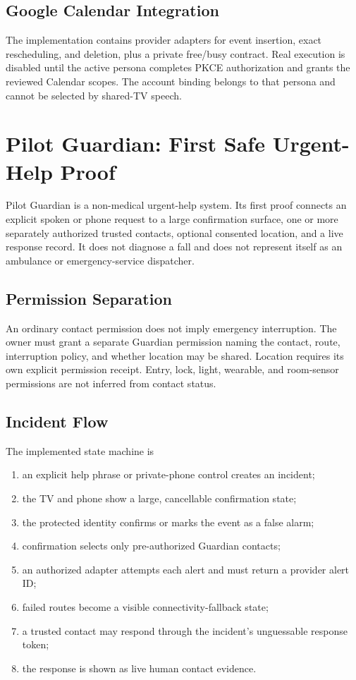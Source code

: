 \subsection{Google Calendar Integration}

The implementation contains provider adapters for event insertion, exact
rescheduling, and deletion, plus a private free/busy contract.  Real execution is
disabled until the active persona completes PKCE authorization and grants the
reviewed Calendar scopes.  The account binding belongs to that persona and cannot
be selected by shared-TV speech.

\section{Pilot Guardian: First Safe Urgent-Help Proof}
\label{sec:pilot-guardian}

Pilot Guardian is a non-medical urgent-help system.  Its first proof connects an
explicit spoken or phone request to a large confirmation surface, one or more
separately authorized trusted contacts, optional consented location, and a live
response record.  It does not diagnose a fall and does not represent itself as an
ambulance or emergency-service dispatcher.

\subsection{Permission Separation}

An ordinary contact permission does not imply emergency interruption.  The owner
must grant a separate Guardian permission naming the contact, route, interruption
policy, and whether location may be shared.  Location requires its own explicit
permission receipt.  Entry, lock, light, wearable, and room-sensor permissions are
not inferred from contact status.

\subsection{Incident Flow}

The implemented state machine is
\begin{enumerate}
  \item an explicit help phrase or private-phone control creates an incident;
  \item the TV and phone show a large, cancellable confirmation state;
  \item the protected identity confirms or marks the event as a false alarm;
  \item confirmation selects only pre-authorized Guardian contacts;
  \item an authorized adapter attempts each alert and must return a provider alert ID;
  \item failed routes become a visible connectivity-fallback state;
  \item a trusted contact may respond through the incident's unguessable response token;
  \item the response is shown as live human contact evidence.
\end{enumerate}

